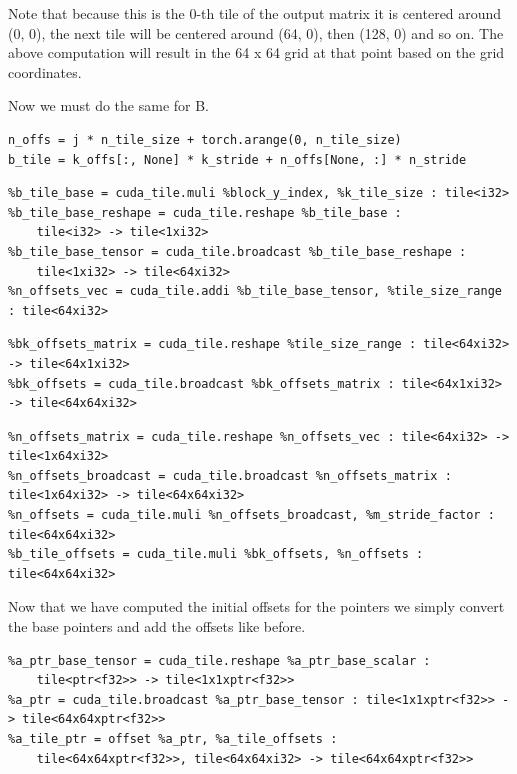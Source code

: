 \documentclass{article}
\begin{document}
Note that because this is the 0-th tile of the output matrix it is centered around (0, 0), the next tile will be centered around (64, 0), then (128, 0) and so on. The above computation will result in the 64 x 64 grid at that point based on the grid coordinates.


Now we must do the same for B.


\begin{lstlisting}
n_offs = j * n_tile_size + torch.arange(0, n_tile_size)
b_tile = k_offs[:, None] * k_stride + n_offs[None, :] * n_stride
\end{lstlisting}

\begin{lstlisting}
%b_tile_base = cuda_tile.muli %block_y_index, %k_tile_size : tile<i32>
%b_tile_base_reshape = cuda_tile.reshape %b_tile_base :
    tile<i32> -> tile<1xi32>
%b_tile_base_tensor = cuda_tile.broadcast %b_tile_base_reshape :
    tile<1xi32> -> tile<64xi32>
%n_offsets_vec = cuda_tile.addi %b_tile_base_tensor, %tile_size_range : tile<64xi32>
\end{lstlisting}

\begin{lstlisting}
%bk_offsets_matrix = cuda_tile.reshape %tile_size_range : tile<64xi32> -> tile<64x1xi32>
%bk_offsets = cuda_tile.broadcast %bk_offsets_matrix : tile<64x1xi32> -> tile<64x64xi32>
\end{lstlisting}

\begin{lstlisting}
%n_offsets_matrix = cuda_tile.reshape %n_offsets_vec : tile<64xi32> -> tile<1x64xi32>
%n_offsets_broadcast = cuda_tile.broadcast %n_offsets_matrix :  tile<1x64xi32> -> tile<64x64xi32>
%n_offsets = cuda_tile.muli %n_offsets_broadcast, %m_stride_factor : tile<64x64xi32>
%b_tile_offsets = cuda_tile.muli %bk_offsets, %n_offsets : tile<64x64xi32>
\end{lstlisting}

Now that we have computed the initial offsets for the pointers we simply convert the base pointers and add the offsets like before.


\begin{lstlisting}
%a_ptr_base_tensor = cuda_tile.reshape %a_ptr_base_scalar :
    tile<ptr<f32>> -> tile<1x1xptr<f32>>
%a_ptr = cuda_tile.broadcast %a_ptr_base_tensor : tile<1x1xptr<f32>> -> tile<64x64xptr<f32>>
%a_tile_ptr = offset %a_ptr, %a_tile_offsets :
    tile<64x64xptr<f32>>, tile<64x64xi32> -> tile<64x64xptr<f32>>
\end{lstlisting}
\end{document}
